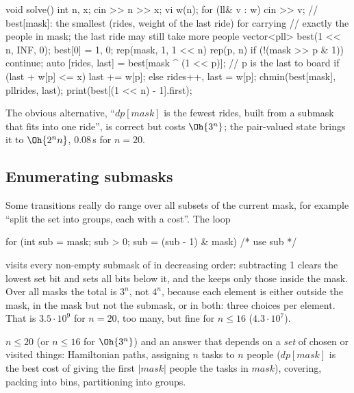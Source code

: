 \begin{code}
void solve() {
    int n, x;
    cin >> n >> x;
    vi w(n);
    for (ll& v : w) cin >> v;
    // best[mask]: the smallest (rides, weight of the last ride) for carrying
    // exactly the people in mask; the last ride may still take more people
    vector<pll> best(1 << n, {INF, 0});
    best[0] = {1, 0};
    rep(mask, 1, 1 << n) rep(p, n) {
        if (!(mask >> p & 1)) continue;
        auto [rides, last] = best[mask ^ (1 << p)];  // p is the last to board
        if (last + w[p] <= x) last += w[p];
        else rides++, last = w[p];
        chmin(best[mask], pll{rides, last});
    }
    print(best[(1 << n) - 1].first);
}
\end{code}

The obvious alternative, ``$dp[\mathit{mask}]$ is the fewest rides, built from a submask that fits into one ride'', is correct but
costs $\Oh{3^n}$; the pair-valued state brings it to $\Oh{2^n n}$, 0.08\,s for $n = 20$.

\subsection{Enumerating submasks}

Some transitions really do range over all subsets of the current mask, for example ``split the set into groups, each with a
cost''. The loop
\begin{code}
for (int sub = mask; sub > 0; sub = (sub - 1) & mask) { /* use sub */ }
\end{code}
visits every non-empty submask of  in decreasing order: subtracting 1 clears the lowest set bit and sets all bits below
it, and the \cc{&} keeps only those inside the mask. Over all masks the total is $3^n$, not $4^n$, because each element is either
outside the mask, in the mask but not the submask, or in both: three choices per element. That is $3.5 \cdot 10^9$ for $n = 20$,
too many, but fine for $n \le 16$ ($4.3 \cdot 10^7$).

\begin{recognize}
$n \le 20$ (or $n \le 16$ for $\Oh{3^n}$) and an answer that depends on a \emph{set} of chosen or visited things: Hamiltonian
paths, assigning $n$ tasks to $n$ people ($dp[\mathit{mask}]$ is the best cost of giving the first $|\mathit{mask}|$ people the tasks in
$\mathit{mask}$), covering, packing into bins, partitioning into groups.
\end{recognize}

